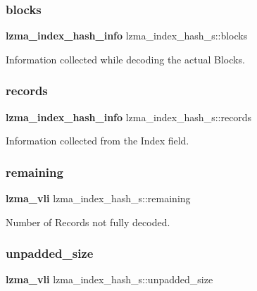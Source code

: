 \subsubsection{blocks}
{\footnotesize\ttfamily \textbf{ lzma\+\_\+index\+\_\+hash\+\_\+info} lzma\+\_\+index\+\_\+hash\+\_\+s\+::blocks}



Information collected while decoding the actual Blocks. 

\mbox{\label{structlzma__index__hash__s_acefccb2b81ef4de69565483be7a323b1}} 
\subsubsection{records}
{\footnotesize\ttfamily \textbf{ lzma\+\_\+index\+\_\+hash\+\_\+info} lzma\+\_\+index\+\_\+hash\+\_\+s\+::records}



Information collected from the Index field. 

\mbox{\label{structlzma__index__hash__s_ac56d05d2b532a923c9719c42a8a22bcc}} 
\subsubsection{remaining}
{\footnotesize\ttfamily \textbf{ lzma\+\_\+vli} lzma\+\_\+index\+\_\+hash\+\_\+s\+::remaining}



Number of Records not fully decoded. 

\mbox{\label{structlzma__index__hash__s_af1c3355a0c7acc984f78ecfcdfec22b7}} 
\subsubsection{unpadded\+\_\+size}
{\footnotesize\ttfamily \textbf{ lzma\+\_\+vli} lzma\+\_\+index\+\_\+hash\+\_\+s\+::unpadded\+\_\+size}



